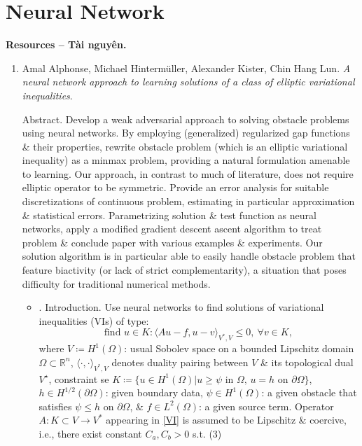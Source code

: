 \documentclass{article}
\begin{document}
\section{Neural Network}
\textbf{\textsf{Resources -- Tài nguyên.}}
\begin{enumerate}
	\item {\sc Amal Alphonse, Michael Hinterm\"uller, Alexander Kister, Chin Hang Lun}. {\it A neural network approach to learning solutions of a class of elliptic variational inequalities}.
	
	{\sf Abstract.} Develop a weak adversarial approach to solving obstacle problems using neural networks. By employing (generalized) regularized gap functions \& their properties, rewrite obstacle problem (which is an elliptic variational inequality) as a minmax problem, providing a natural formulation amenable to learning. Our approach, in contrast to much of literature, does not require elliptic operator to be symmetric. Provide an error analysis for suitable discretizations of continuous problem, estimating in particular approximation \& statistical errors. Parametrizing solution \& test function as neural networks, apply a modified gradient descent ascent algorithm to treat problem \& conclude paper with various examples \& experiments. Our solution algorithm is in particular able to easily handle obstacle problem that feature biactivity (or lack of strict complementarity), a situation that poses difficulty for traditional numerical methods.
	\begin{itemize}
		\item {. Introduction.} Use neural networks to find solutions of variational inequalities (VIs) of type:
		\begin{equation}
			\label{VI}
			\mbox{find } u\in K:\langle Au - f,u - v\rangle_{V^*,V}\le0,\ \forall v\in K,
		\end{equation}
		where $V\coloneqq H^1(\Omega)$: usual Sobolev space on a bounded Lipschitz domain $\Omega\subset\mathbb{R}^n$, $\langle\cdot,\cdot\rangle_{V^*,V}$ denotes duality pairing between $V$ \& its topological dual $V^\star$, constraint se $K\coloneqq\{u\in H^1(\Omega)|u\ge\psi\mbox{ in }\Omega,\,u = h\mbox{ on }\partial\Omega\}$, $h\in H^{1/2}(\partial\Omega)$: given boundary data, $\psi\in H^1(\Omega)$: a given obstacle that satisfies $\psi\le h$ on $\partial\Omega$, \& $f\in L^2(\Omega)$: a given source term. Operator $A:K\subset V\to V^*$ appearing in \eqref{VI} is assumed to be Lipschitz \& coercive, i.e., there exist constant $C_a,C_b > 0$ s.t. (3)
		\begin{align}

\end{align}
\end{itemize}
\end{enumerate}
\end{document}
